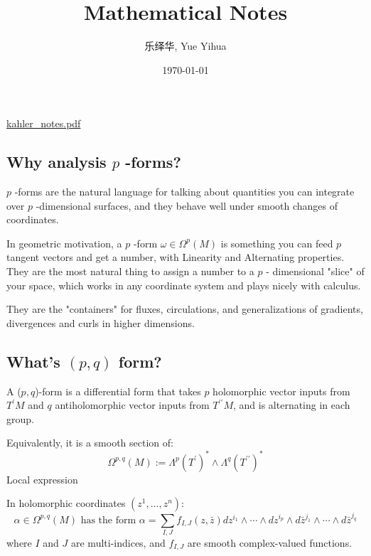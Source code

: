 \documentclass{amsart}
\author{乐绎华, Yue Yihua}
\date{\today}
\title{Mathematical Notes}
\theoremstyle{plain}
\theoremstyle{definition}
\theoremstyle{remark}
\begin{document}
\maketitle
\tableofcontents

\href{https://math.uchicago.edu/~dannyc/notes/kahler_notes.pdf}{kahler\_notes.pdf}

\subsection{Why analysis \texorpdfstring{$p$}{p} -forms?}

$p$ -forms are the natural language for talking about quantities you can integrate over $p$ -dimensional surfaces, and they behave well under smooth changes of coordinates.

In geometric motivation, a $p$ -form $\omega\in \Omega^{p}(M)$ is something you can feed $p$ tangent vectors and get a number, with Linearity and Alternating properties. They are the most natural thing to assign a number to a $p$ - dimensional "slice" of your space, which works in any coordinate system and plays nicely with calculus.

They are the "containers" for fluxes, circulations, and generalizations of gradients, divergences and curls in higher dimensions.

\subsection{What's \texorpdfstring{$(p,q)$}{(p,q)} form?}

A ($p, q$)-form is a differential form that takes $p$ holomorphic vector inputs from $T^{\prime} M$ and $q$ antiholomorphic vector inputs from $T^{\prime \prime} M$, and is alternating in each group.

Equivalently, it is a smooth section of:
\[
\Omega^{p, q}(M):=\Lambda^p\left(T^{\prime}\right)^* \wedge \Lambda^q\left(T^{\prime \prime}\right)^*
\]
Local expression

In holomorphic coordinates $(z^1, \ldots, z^n)$:
\[
\alpha \in \Omega^{p, q}(M) \text{ has the form } \alpha=\sum_{I, J} f_{I, J}(z, \bar{z}) d z^{i_1} \wedge \cdots \wedge d z^{i_p} \wedge d \bar{z}^{j_1} \wedge \cdots \wedge d \bar{z}^{j_q}
\]
where $I$ and $J$ are multi-indices, and $f_{I, J}$ are smooth complex-valued functions.
\end{document}
